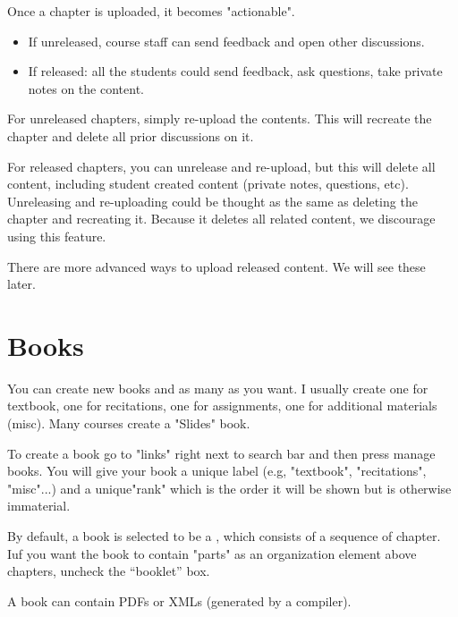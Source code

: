 \begin{gram}
Once a chapter is uploaded, it becomes "actionable".  

\begin{itemize}
\item
If unreleased, course staff can send feedback and open other discussions. 
\item
If released: all the students could send feedback, ask questions, take private notes on the content.
\end{itemize}
\end{gram}


\begin{gram}

For unreleased chapters, simply re-upload the contents.  This will
recreate the chapter and delete all prior discussions on it.  

For released chapters, you can unrelease and re-upload, but this will
delete all content, including student created content (private notes,
questions, etc). 
%
Unreleasing and re-uploading could be thought as the same as deleting the chapter and recreating it.
%
Because it deletes all related content, we discourage using this
feature.

There are more advanced ways to upload released content. We will see
these later.
\end{gram}

\section{Books}
\label{guide:books}

\begin{gram}
You can create new books and as many as you want.  I usually create one for textbook, one for recitations, one for assignments, one for additional materials (misc).  Many courses create a "Slides" book.  

To create a book go to "links" right next to search bar and then press
manage books.  You will give your book a unique label (e.g,
"textbook", "recitations", "misc"...) and a unique"rank" which is the
order it will be shown but is otherwise immaterial.  


By default, a book is selected to be a , which
consists of a sequence of chapter.  
%
Iuf you want the book to contain "parts" as an organization element
above chapters, uncheck the ``booklet'' box.  

A book can contain PDFs or XMLs (generated by a compiler).
\end{gram}

